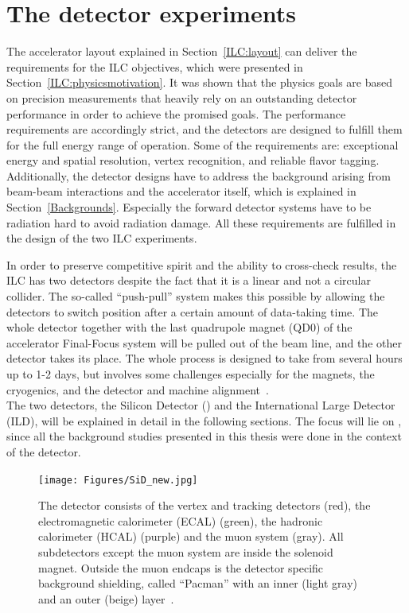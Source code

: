 \section{The detector experiments}
\label{ILC:detectors}
The accelerator layout explained in Section~\ref{ILC:layout} can deliver the requirements for the ILC objectives, which were presented in Section~\ref{ILC:physicsmotivation}.
It was shown that the physics goals are based on precision measurements that heavily rely on an outstanding detector performance in order to achieve the promised goals.
The performance requirements are accordingly strict, and the detectors are designed to fulfill them for the full energy range of operation.
Some of the requirements are: exceptional energy and spatial resolution, vertex recognition, and reliable flavor tagging.
Additionally, the detector designs have to address the background arising from beam-beam interactions and the accelerator itself, which is explained in Section~\ref{Backgrounds}.
Especially the forward detector systems have to be radiation hard to avoid radiation damage.
All these requirements are fulfilled in the design of the two ILC experiments.

In order to preserve competitive spirit and the ability to cross-check results, the ILC has two detectors despite the fact that it is a linear and not a circular collider.
The so-called ``push-pull'' system makes this possible by allowing the detectors to switch position after a certain amount of data-taking time.
The whole detector together with the last quadrupole magnet (QD0) of the accelerator Final-Focus system will be pulled out of the beam line, and the other detector takes its place.
The whole process is designed to take from several hours up to 1-2 days, but involves some challenges especially for the magnets, the cryogenics, and the detector and machine alignment~\cite[p. 28-29]{TDR1}.
\\The two detectors, the Silicon Detector (\sid) and the International Large Detector (ILD), will be explained in detail in the following sections.
The focus will lie on \sid, since all the background studies presented in this thesis were done in the context of the \sid detector.

\begin{figure}[!h]
\centering
\texttt{[image: Figures/SiD\_new.jpg]}
\caption[Visualization of the \sid detector]{The \sid detector consists of the vertex and tracking detectors (red), the electromagnetic calorimeter (ECAL) (green), the hadronic calorimeter (HCAL) (purple) and the muon system (gray).
All subdetectors except the muon system are inside the solenoid magnet.
Outside the muon endcaps is the detector specific background shielding, called ``Pacman'' with an inner (light gray) and an outer (beige) layer~\cite{SiD_Geo}.}
\label{fig:SiD}
\end{figure}
